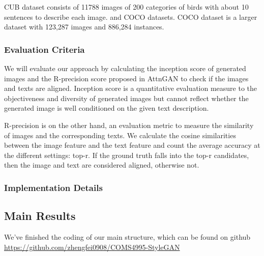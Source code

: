 \documentclass{article}
\begin{document}
CUB dataset consists of 11788 images of 200 categories of birds with about 10 sentences to describe each image. 
and COCO\cite{coco} datasets. COCO dataset is a larger dataset with 123,287 images and 886,284 instances.

\subsubsection{Evaluation Criteria}

We will evaluate our approach by calculating the inception score\cite{inception} of generated images and the R-precision score proposed in AttnGAN \cite{attngan} to check if the images and texts are aligned.
Inception score is a quantitative evaluation measure to the objectiveness and diversity of generated images but cannot reflect whether the generated image is well conditioned on the given text description. 

R-precision is on the other hand, an evaluation metric to measure the similarity of images and the corresponding texts. We calculate the cosine similarities between the image feature and the text feature and count the average accuracy at the different settings: top-r. If the ground truth falls into the top-r candidates, then the image and text are considered aligned, otherwise not.

\subsubsection{Implementation Details}
\subsection{Main Results}
We've finished the coding of our main structure, which can be found on github \href{https://github.com/zhengfei0908/COMS4995-StyleGAN}{https://github.com/zhengfei0908/COMS4995-StyleGAN}

\newpage

\nocite{langley00}





\end{document}

